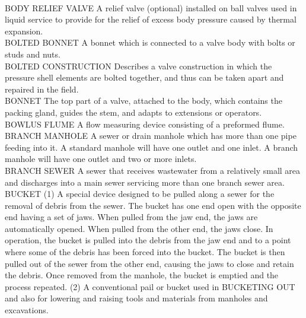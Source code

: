 \documentclass{article}
\begin{document}
\vspace{0.3cm}\\
BODY RELIEF VALVE
A relief valve (optional) installed on ball valves used in liquid service to provide for the relief of excess body pressure caused by thermal expansion.
\vspace{0.3cm}\\
BOLTED BONNET
A bonnet which is connected to a valve body with bolts or studs and nuts.
\vspace{0.3cm}\\
BOLTED CONSTRUCTION
Describes a valve construction in which the pressure shell elements are bolted together, and thus can be taken apart and repaired in the field.
\vspace{0.3cm}\\
BONNET
The top part of a valve, attached to the body, which contains the packing gland, guides the stem, and adapts to extensions or operators.
\vspace{0.3cm}\\
BOWLUS FLUME
A flow measuring device consisting of a preformed flume.
\vspace{0.3cm}\\
BRANCH MANHOLE
A sewer or drain manhole which has more than one pipe feeding into it. A standard manhole will have one outlet and one inlet. A branch manhole will have one outlet and two or more inlets. 
\vspace{0.3cm}\\
BRANCH SEWER
A sewer that receives wastewater from a relatively small area and discharges into a main sewer servicing more than one branch sewer area. 
\vspace{0.3cm}\\
BUCKET
(1) A special device designed to be pulled along a sewer for the removal of debris from the sewer. The bucket has one end open with the opposite end having a set of jaws. When pulled from the jaw end, the jaws are automatically opened. When pulled from the other end, the jaws close. In operation, the bucket is pulled into the debris from the jaw end and to a point where some of the debris has been forced into the bucket. The bucket is then pulled out of the sewer from the other end, causing the jaws to close and retain the debris. Once removed from the manhole, the bucket is emptied and the process repeated. (2) A conventional pail or bucket used in BUCKETING OUT and also for lowering and raising tools and materials from manholes and excavations. 
\vspace{0.3cm}\\
\end{document}
